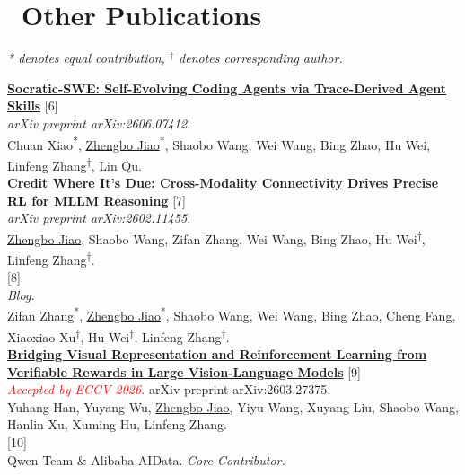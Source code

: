 \documentclass{resume}
\begin{document}
\section{\faFileTextO\ Other Publications}
{\small \textit{* denotes equal contribution, $^\dagger$ denotes corresponding author.}}  

\noindent \href{https://arxiv.org/abs/2606.07412}{\textbf{Socratic-SWE: Self-Evolving Coding Agents via Trace-Derived Agent Skills}} \hfill [6] \\
\textit{arXiv preprint arXiv:2606.07412.} \\
Chuan Xiao\textsuperscript{*}, \underline{Zhengbo Jiao}\textsuperscript{*}, Shaobo Wang, Wei Wang, Bing Zhao, Hu Wei, Linfeng Zhang\textsuperscript{†}, Lin Qu. \\

\noindent \href{https://arxiv.org/abs/2602.11455}{\textbf{Credit Where It's Due: Cross-Modality Connectivity Drives Precise RL for MLLM Reasoning}} \hfill [7]\\
\textit{arXiv preprint arXiv:2602.11455.} \\
\underline{Zhengbo Jiao}, Shaobo Wang, Zifan Zhang, Wei Wang, Bing Zhao, Hu Wei\textsuperscript{†}, Linfeng Zhang\textsuperscript{†}. \\

 \hfill [8]\\
\textit{Blog.} \\
Zifan Zhang\textsuperscript{*}, \underline{Zhengbo Jiao}\textsuperscript{*}, Shaobo Wang, Wei Wang, Bing Zhao, Cheng Fang, Xiaoxiao Xu\textsuperscript{†}, Hu Wei\textsuperscript{†}, Linfeng Zhang\textsuperscript{†}. \\

\noindent \href{https://arxiv.org/abs/2603.27375}{\textbf{Bridging Visual Representation and Reinforcement Learning from Verifiable Rewards in Large Vision-Language Models}} \hfill [9]\\
\textit{\textcolor{red}{Accepted by ECCV 2026.}} arXiv preprint arXiv:2603.27375. \\
Yuhang Han, Yuyang Wu, \underline{Zhengbo Jiao}, Yiyu Wang, Xuyang Liu, Shaobo Wang, Hanlin Xu, Xuming Hu, Linfeng Zhang. \\

 \hfill [10]\\
Qwen Team \& Alibaba AIData. \textit{Core Contributor.} \\
 \\
\end{document}
